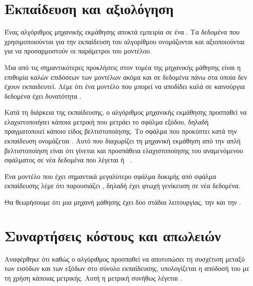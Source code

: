 \section{Εκπαίδευση και αξιολόγηση}
Ένας αλγόριθμος μηχανικής εκμάθησης αποκτά εμπειρία σε ένα .
Τα δεδομένα που χρησιμοποιούνται για την εκπαίδευση του αλγορίθμου ονομάζονται  και αξιοποιούνται για να προσαρμοστούν οι παράμετροι του μοντέλου.

Μια από τις σημαντικότερες προκλήσεις στον τομέα της μηχανικής μάθησης είναι η επιθυμία καλών επιδόσεων των μοντέλων ακόμα και σε δεδομένα πάνω στα οποία δεν έχουν εκπαιδευτεί.
Λέμε ότι ένα μοντέλο που μπορεί να αποδίδει καλά σε καινούργια δεδομένα έχει δυνατότητα .

Κατά τη διάρκεια της εκπαίδευσης, ο αλγόριθμος μηχανικής εκμάθησης προσπαθεί να ελαχιστοποιήσει κάποια μετρική που μετράει το σφάλμα εξόδου, δηλαδή πραγματοποιεί κάποιο είδος βελτιστοποίησης.
Το σφάλμα που προκύπτει κατά την εκπαίδευση ονομάζεται .
Αυτό που διαχωρίζει τη μηχανική εκμάθηση από την απλή βελτιστοποίηση είναι ότι γίνεται και προσπάθεια ελαχιστοποίησης του αναμενόμενου σφάλματος σε νέα δεδομένα που
λέγεται  ή ~\cite{goodfellow}.

Ένα μοντέλο που έχει σημαντικά μεγαλύτερο σφάλμα δοκιμής από σφάλμα εκπαίδευσης λέμε ότι παρουσιάζει ,
δηλαδή έχει φτωχή γενίκευση σε νέα δεδομένα.

Θα θεωρήσουμε ότι μια μηχανή μάθησης έχει δύο στάδια λειτουργίας, την  και την .

\section{Συναρτήσεις κόστους και απωλειών}
Αναφέρθηκε ότι καθώς ο αλγόριθμος προσπαθεί να αποτυπώσει τη συσχέτιση μεταξύ των εισόδων και των εξόδων στο σύνολο εκπαίδευσης, υπολογίζεται η απόδοσή του με τη χρήση κάποιας μετρικής.
Αυτή η μετρική συνήθως λέγεται .

